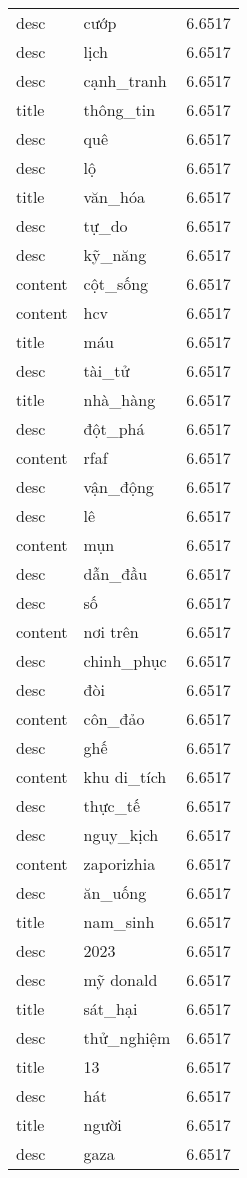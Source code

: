 \documentclass{article}
\begin{document}
\begin{tabular}{lll}
desc & cướp & 6.6517\\
desc & lịch & 6.6517\\
desc & cạnh\_tranh & 6.6517\\
title & thông\_tin & 6.6517\\
desc & quê & 6.6517\\
desc & lộ & 6.6517\\
title & văn\_hóa & 6.6517\\
desc & tự\_do & 6.6517\\
desc & kỹ\_năng & 6.6517\\
content & cột\_sống & 6.6517\\
content & hcv & 6.6517\\
title & máu & 6.6517\\
desc & tài\_tử & 6.6517\\
title & nhà\_hàng & 6.6517\\
desc & đột\_phá & 6.6517\\
content & rfaf & 6.6517\\
desc & vận\_động & 6.6517\\
desc & lê & 6.6517\\
content & mụn & 6.6517\\
desc & dẫn\_đầu & 6.6517\\
desc & số & 6.6517\\
content & nơi trên & 6.6517\\
desc & chinh\_phục & 6.6517\\
desc & đòi & 6.6517\\
content & côn\_đảo & 6.6517\\
desc & ghế & 6.6517\\
content & khu di\_tích & 6.6517\\
desc & thực\_tế & 6.6517\\
desc & nguy\_kịch & 6.6517\\
content & zaporizhia & 6.6517\\
desc & ăn\_uống & 6.6517\\
title & nam\_sinh & 6.6517\\
desc & 2023 & 6.6517\\
desc & mỹ donald & 6.6517\\
title & sát\_hại & 6.6517\\
desc & thử\_nghiệm & 6.6517\\
title & 13 & 6.6517\\
desc & hát & 6.6517\\
title & người & 6.6517\\
desc & gaza & 6.6517\\

\end{tabular}
\end{document}
